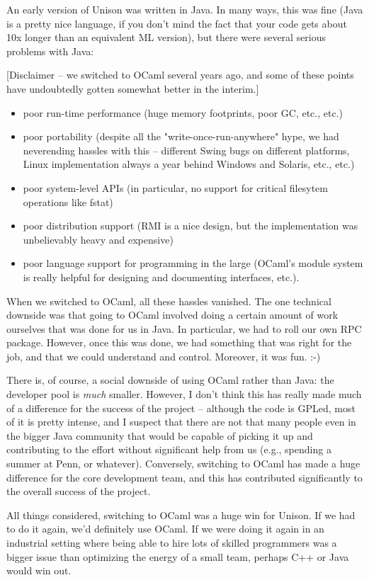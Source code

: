 \begin{itemize}
 An early version of Unison was written in Java. In many ways, this was
 fine (Java is a pretty nice language, if you don't mind the fact that
 your code gets about 10x longer than an equivalent ML version), but there
 were several serious problems with Java:
 
 [Disclaimer -- we switched to OCaml several years ago, and some of these
 points have undoubtedly gotten somewhat better in the interim.]
 
 \begin{itemize}
 \item poor run-time performance (huge memory footprints, poor GC, etc.,
 etc.)
 
 \item poor portability (despite all the "write-once-run-anywhere" hype, we
 had neverending hassles with this -- different Swing bugs on
 different platforms, Linux implementation always a year behind
 Windows and Solaris, etc., etc.)
 
 \item poor system-level APIs (in particular, no support for critical
 filesytem operations like fstat)
 
 \item poor distribution support (RMI is a nice design, but the
 implementation was unbelievably heavy and expensive)

 \item poor language support for programming  in the large (OCaml's module
 system is really helpful for designing and documenting interfaces, etc.).
 \end{itemize}

 When we switched to OCaml, all these hassles vanished. The one technical
 downside was that going to OCaml involved doing a certain amount of work
 ourselves that was done for us in Java. In particular, we had to roll
 our own RPC package. However, once this was done, we had something that
 was right for the job, and that we could understand and control.
 Moreover, it was fun. :-)
 
 There is, of course, a social downside of using OCaml rather than Java:
 the developer pool is {\em much} smaller. However, I don't think this has
 really made much of a difference for the success of the project --
 although the code is GPLed, most of it is pretty intense, and I suspect
 that there are not that many people even in the bigger Java community
 that would be capable of picking it up and contributing to the effort
 without significant help from us (e.g., spending a summer at Penn, or
 whatever). Conversely, switching to OCaml has made a huge difference for
 the core development team, and this has contributed significantly to the
 overall success of the project.
 
 All things considered, switching to OCaml was a huge win for Unison. If
 we had to do it again, we'd definitely use OCaml. If we were doing it again
 in an industrial setting where being able to hire lots of skilled
 programmers was a bigger issue than optimizing the energy of a small
 team, perhaps C++ or Java would win out.

\end{itemize}

